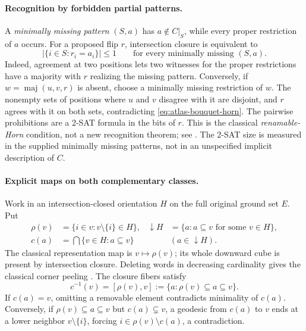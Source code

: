 \paragraph{Recognition by forbidden partial patterns.}
A \emph{minimally missing pattern} $(S,a)$ has
$a\notin C|_S$, while every proper restriction of $a$ occurs. For a proposed
flip $r$, intersection closure is equivalent to
\begin{equation}\label{eq:atlas-bouquet-horn}
 \bigl|\{i\in S:r_i=a_i\}\bigr|\le1
 \qquad\text{for every minimally missing }(S,a).
\end{equation}
Indeed, agreement at two positions lets two witnesses for the proper
restrictions have a majority with $r$ realizing the missing pattern.
Conversely, if $w=\operatorname{maj}(u,v,r)$ is absent, choose a minimally
missing restriction of $w$. The nonempty sets of positions where $u$ and
$v$ disagree with it are disjoint, and $r$ agrees with it on both sets,
contradicting \eqref{eq:atlas-bouquet-horn}.
The pairwise prohibitions are a 2-SAT formula in the bits of $r$. This is
the classical \emph{renamable-Horn} condition, not a new recognition
theorem; see \cite[\texttt{lem:horn-test}]{BouquetProjection}.
The 2-SAT size is measured in the supplied minimally missing patterns,
not in an unspecified implicit description of $C$.

\paragraph{Explicit maps on both complementary classes.}
Work in an intersection-closed orientation $H$ on the full original
ground set $E$. Put
\[
 \begin{aligned}
 \rho(v)&=\{i\in v:v\setminus\{i\}\in H\},&
 \downarrow H&=\{a:a\subseteq v\text{ for some }v\in H\},\\
 c(a)&=\bigcap\{v\in H:a\subseteq v\}
       &&(a\in\downarrow H).
 \end{aligned}
\]
The classical representation map is $v\mapsto\rho(v)$; its whole downward
cube is present by intersection closure. Deleting words in decreasing
cardinality gives the classical corner peeling
\cite[Proposition~4.9]{CCMW}. The closure fibers satisfy
\begin{equation}\label{eq:atlas-bouquet-fibers}
 c^{-1}(v)=[\rho(v),v]
 :=\{a:\rho(v)\subseteq a\subseteq v\}.
\end{equation}
If $c(a)=v$, omitting a removable element contradicts minimality of $c(a)$.
Conversely, if $\rho(v)\subseteq a\subseteq v$ but $c(a)\subsetneq v$,
a geodesic from $c(a)$ to $v$ ends at a lower neighbor $v\setminus\{i\}$,
forcing $i\in\rho(v)\setminus c(a)$, a contradiction.

